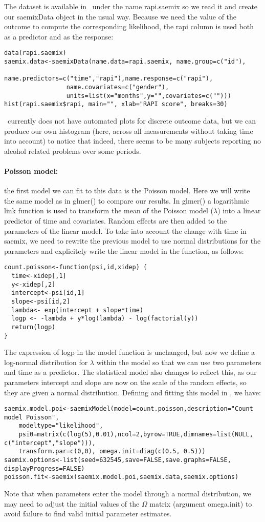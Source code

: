The dataset is available in \monolix~under the name {\sf rapi.saemix} so we read it and create our saemixData object in the usual way. Because we need the value of the outcome to compute the corresponding likelihood, the {\sf rapi} column is used both as a predictor and as the response:
\begin{verbatim}
data(rapi.saemix)
saemix.data<-saemixData(name.data=rapi.saemix, name.group=c("id"),
                 name.predictors=c("time","rapi"),name.response=c("rapi"),
                 name.covariates=c("gender"),
                 units=list(x="months",y="",covariates=c("")))
hist(rapi.saemix$rapi, main="", xlab="RAPI score", breaks=30)
\end{verbatim}
\monolix~currently does not have automated plots for discrete outcome data, but we can produce our own histogram (here, across all measurements without taking time into account) to notice that indeed, there seems to be many subjects reporting no alcohol related problems over some periods.


\paragraph{Poisson model:} the first model we can fit to this data is the Poisson model. Here we will write the same model as in {\sf glmer()} to compare our results. In {\sf glmer()} a logarithmic link function is used to transform the mean of the Poisson model ($\lambda$) into a linear predictor of time and covariates. Random effects are then added to the parameters of the linear model. To take into account the change with time in {\sf saemix}, we need to rewrite the previous model to use normal distributions for the parameters and explicitely write the linear model in the function, as follows:
\begin{verbatim}
count.poisson<-function(psi,id,xidep) { 
  time<-xidep[,1]
  y<-xidep[,2]
  intercept<-psi[id,1]
  slope<-psi[id,2]
  lambda<- exp(intercept + slope*time)
  logp <- -lambda + y*log(lambda) - log(factorial(y))
  return(logp)
}
\end{verbatim}
The expression of logp in the model function is unchanged, but now we define a log-normal distribution for $\lambda$ within the model so that we can use two parameters and time as a predictor. The statistical model also changes to reflect this, as our parameters intercept and slope are now on the scale of the random effects, so they are given a normal distribution. Defining and fitting this model in \monolix, we have:
\begin{verbatim}
saemix.model.poi<-saemixModel(model=count.poisson,description="Count model Poisson",
    modeltype="likelihood",   
    psi0=matrix(c(log(5),0.01),ncol=2,byrow=TRUE,dimnames=list(NULL, c("intercept","slope"))), 
    transform.par=c(0,0), omega.init=diag(c(0.5, 0.5)))
saemix.options<-list(seed=632545,save=FALSE,save.graphs=FALSE, displayProgress=FALSE)
poisson.fit<-saemix(saemix.model.poi,saemix.data,saemix.options)
\end{verbatim}
Note that when parameters enter the model through a normal distribution, we may need to adjust the initial values of the $\Omega$ matrix (argument {\sf omega.init}) to avoid failure to find valid initial parameter estimates.

